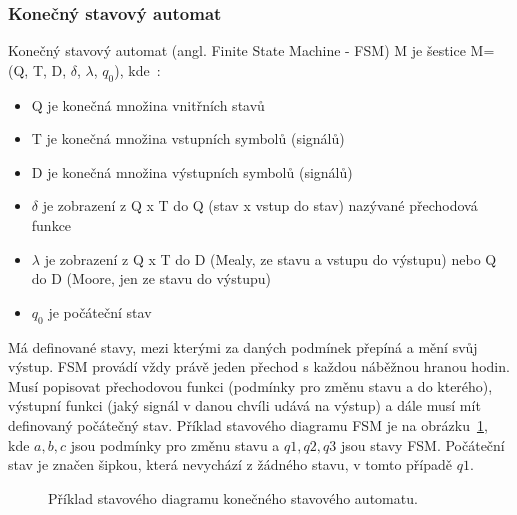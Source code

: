 \documentclass{report}
\begin{document}
\subsubsection{Konečný stavový automat}
Konečný stavový automat (angl. Finite State Machine - FSM) M je šestice M=(Q, T, D, $\delta$, $\lambda$, $q_0$), kde~\cite{jazykyapreklady}:
\begin{itemize}
  \item Q je konečná množina vnitřních stavů
  \item T je konečná množina vstupních symbolů (signálů)
  \item D je konečná množina výstupních symbolů (signálů)
  \item $\delta$ je zobrazení z Q x T do Q (stav x vstup do stav) nazývané přechodová funkce
  \item $\lambda$ je zobrazení z Q x T do D (Mealy, ze stavu a vstupu do výstupu) nebo Q do D (Moore, jen ze stavu do výstupu)
  \item $q_0$ je počáteční stav
\end{itemize}
Má definované stavy, mezi kterými za daných podmínek přepíná a mění svůj výstup. FSM provádí vždy právě jeden přechod s každou náběžnou hranou hodin. Musí popisovat přechodovou funkci (podmínky pro změnu stavu a do kterého), výstupní funkci (jaký signál v danou chvíli udává na výstup) a dále musí mít definovaný počátečný stav. Příklad stavového diagramu FSM je na obrázku~\ref{fig:fsmexample}, kde $a, b, c$ jsou podmínky pro změnu stavu a $q1, q2, q3$ jsou stavy FSM. Počáteční stav je značen šipkou, která nevychází z žádného stavu, v tomto případě $q1$.
\begin{figure}
\begin{center}
\end{center}
\caption{Příklad stavového diagramu konečného stavového automatu.}
\label{fig:fsmexample}
\end{figure}
\end{document}
